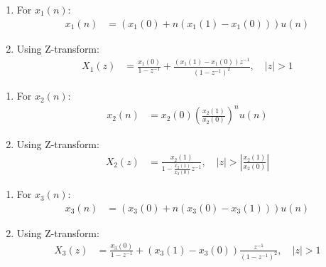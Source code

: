 \documentclass[journal,12pt,twocolumn]{IEEEtran}
\theoremstyle{remark}
\begin{document}
\begin{enumerate}
    \item For $x_1(n)$:
    \begin{align}
        x_1(n) &= (x_1(0) + n(x_1(1)-x_1(0)))u(n)
    \end{align}
    \item Using Z-transform:
    \begin{align}
        X_1(z) &= \frac{x_1(0)}{1-z^{-1}} + \frac{(x_1(1)-x_1(0))z^{-1}}{(1-z^{-1})^2} , \quad |z| > 1
    \end{align}
\end{enumerate}


    
\begin{enumerate}
    \item For $x_2(n)$:
    \begin{align}
        x_2(n) &= x_2(0)\left(\frac{x_2(1)}{x_2(0)}\right)^n u(n)
    \end{align}
    \item Using Z-transform:
    \begin{align}
        X_2(z) &= \frac{x_2(1)}{1-\frac{x_2(1)}{x_2(0)}z^{-1}},  \quad \left|z\right|>\left|\frac{x_2(1)}{x_2(0)}\right|
    \end{align}
\end{enumerate}

\begin{enumerate}
    \item For $x_3(n)$:
    \begin{align}
        x_3(n) &= \left(x_3(0) + n\left(x_3(0) - x_3(1)\right)\right)u(n)
    \end{align}
    \item Using Z-transform:
    \begin{align}
        X_3(z) &= \frac{x_3(0)}{1-z^{-1}} + \left(x_3(1) - x_3(0)\right)\frac{z^{-1}}{(1-z^{-1})^2} , \quad |z| > 1
    \end{align}
\end{enumerate}
\end{document}
